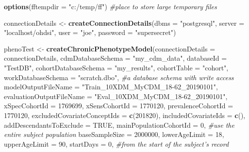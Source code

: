 \documentclass[
]{article}
\newenvironment{Shaded}{\begin{snugshade}}{\end{snugshade}}
\newcommand{\CommentTok}[1]{\textcolor[rgb]{0.56,0.35,0.01}{\textit{#1}}}
\newcommand{\DataTypeTok}[1]{\textcolor[rgb]{0.13,0.29,0.53}{#1}}
\newcommand{\DecValTok}[1]{\textcolor[rgb]{0.00,0.00,0.81}{#1}}
\newcommand{\KeywordTok}[1]{\textcolor[rgb]{0.13,0.29,0.53}{\textbf{#1}}}
\newcommand{\NormalTok}[1]{#1}
\newcommand{\OtherTok}[1]{\textcolor[rgb]{0.56,0.35,0.01}{#1}}
\newcommand{\StringTok}[1]{\textcolor[rgb]{0.31,0.60,0.02}{#1}}
\begin{document}
\begin{Shaded}
\begin{Highlighting}[]
\KeywordTok{options}\NormalTok{(}\DataTypeTok{fftempdir =} \StringTok{"c:/temp/ff"}\NormalTok{) }\CommentTok{#place to store large temporary files}

\NormalTok{connectionDetails <-}\StringTok{ }\KeywordTok{createConnectionDetails}\NormalTok{(}\DataTypeTok{dbms =} \StringTok{"postgresql"}\NormalTok{,}
                                              \DataTypeTok{server =} \StringTok{"localhost/ohdsi"}\NormalTok{,}
                                              \DataTypeTok{user =} \StringTok{"joe"}\NormalTok{,}
                                              \DataTypeTok{password =} \StringTok{"supersecret"}\NormalTok{)}

\NormalTok{phenoTest <-}\StringTok{ }\KeywordTok{createChronicPhenotypeModel}\NormalTok{(}\DataTypeTok{connectionDetails =}\NormalTok{ connectionDetails,}
                \DataTypeTok{cdmDatabaseSchema =} \StringTok{"my_cdm_data"}\NormalTok{,}
                \DataTypeTok{databaseId =} \StringTok{"TestDB"}\NormalTok{,}
                \DataTypeTok{cohortDatabaseSchema =} \StringTok{"my_results"}\NormalTok{,}
                \DataTypeTok{cohortTable  =} \StringTok{"cohort"}\NormalTok{,}
                \DataTypeTok{workDatabaseSchema =} \StringTok{"scratch.dbo"}\NormalTok{, }\CommentTok{#a database schema with write access}
                \DataTypeTok{modelOutputFileName =} \StringTok{"Train_10XDM_MyCDM_18-62_20190101"}\NormalTok{,}
                \DataTypeTok{evaluationOutputFileName =} \StringTok{"Eval_10XDM_MyCDM_18-62_20190101"}\NormalTok{,}
                \DataTypeTok{xSpecCohortId =} \DecValTok{1769699}\NormalTok{,}
                \DataTypeTok{xSensCohortId =} \DecValTok{1770120}\NormalTok{,}
                \DataTypeTok{prevalenceCohortId =} \DecValTok{1770120}\NormalTok{,}
                \DataTypeTok{excludedCovariateConceptIds =} \KeywordTok{c}\NormalTok{(}\DecValTok{201820}\NormalTok{), }
                \DataTypeTok{includedCovariateIds =} \KeywordTok{c}\NormalTok{(),}
                \DataTypeTok{addDescendantsToExclude =} \OtherTok{TRUE}\NormalTok{,}
                \DataTypeTok{mainPopulationCohortId =} \DecValTok{0}\NormalTok{, }\CommentTok{#use the entire subject population}
                \DataTypeTok{baseSampleSize =} \DecValTok{2000000}\NormalTok{,}
                \DataTypeTok{lowerAgeLimit =} \DecValTok{18}\NormalTok{, }
                \DataTypeTok{upperAgeLimit =} \DecValTok{90}\NormalTok{,}
                \DataTypeTok{startDays =} \DecValTok{0}\NormalTok{, }\CommentTok{#from the start of the subject's record}

\end{Highlighting}
\end{Shaded}
\end{document}
